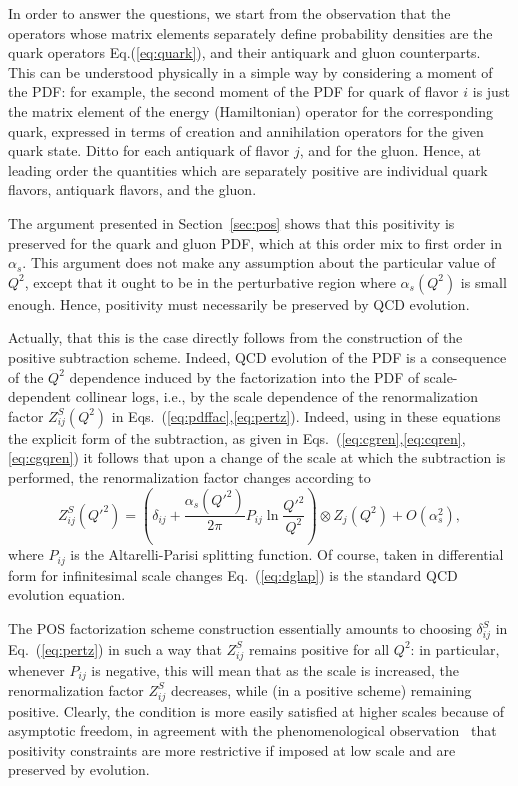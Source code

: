 In order to answer the questions, we start from the observation that
the operators whose matrix elements separately define probability densities are
the quark operators Eq.(\ref{eq:quark}), and their antiquark and gluon
counterparts. This can be understood physically in a simple way by
considering a moment of the PDF: for example, the second moment of the
PDF for quark of flavor $i$ is just the matrix element of the energy
(Hamiltonian) operator for the corresponding quark, expressed in terms
of creation and annihilation operators for the given quark state.
Ditto for each antiquark of
flavor $j$, and for the gluon. Hence, at leading order the quantities
which are separately positive are individual quark flavors, antiquark
flavors, and the gluon.

The argument presented in Section~\ref{sec:pos} shows that this
positivity is preserved for the quark and gluon PDF, which at this
order mix to first order in $\alpha_s$. This argument does not make
any assumption about the particular value of $Q^2$, except that it
ought to be in the perturbative region where $\alpha_s(Q^2)$ is small
enough. Hence, positivity must necessarily be preserved by QCD
evolution.

Actually,  that this is the case directly follows from the construction of the
positive subtraction scheme.
Indeed, QCD evolution of the PDF is a consequence of the $Q^2$
dependence induced by the factorization into the PDF of
scale-dependent collinear logs, i.e., by the scale dependence of the
renormalization factor $Z^S_{ij}(Q^2)$ in
Eqs.~(\ref{eq:pdffac},\ref{eq:pertz}). Indeed, using in these
equations
the explicit form
of the subtraction, as given in
Eqs.~(\ref{eq:cgren},\ref{eq:cqren},\ref{eq:cgqren}) it follows that
upon a change of the scale at which the subtraction is performed, the
renormalization factor changes according to
\begin{equation}\label{eq:dglap}
  Z^S_{ij}({Q'}^2)=\left(\delta_{ij}+\frac{\alpha_s({Q'}^2)}{2\pi}P_{ij}\ln\frac{{Q'}^2}{Q^2}\right)\otimes
  Z_j(Q^2) +O(\alpha_s^2),
\end{equation}
where $P_{ij}$ is the Altarelli-Parisi splitting function. Of course,
taken in differential form for infinitesimal scale changes
Eq.~(\ref{eq:dglap}) is the standard QCD evolution equation.

The POS factorization scheme construction essentially amounts to
choosing $\delta^{S}_{ij}$ in Eq.~(\ref{eq:pertz}) in  such a way that
$Z_{ij}^{S}$ remains positive for all $Q^2$: in particular, whenever
$P_{ij}$ is negative, this will mean that as the scale is increased,
the renormalization factor $Z_{ij}^S$ decreases, while (in a positive
scheme) remaining positive. Clearly, the condition is more easily
satisfied at higher scales because of asymptotic freedom, in agreement
with the phenomenological observation~\cite{Ball:2010de,Ball:2014uwa}
that positivity constraints are more restrictive if imposed at low
scale and are preserved by evolution.

